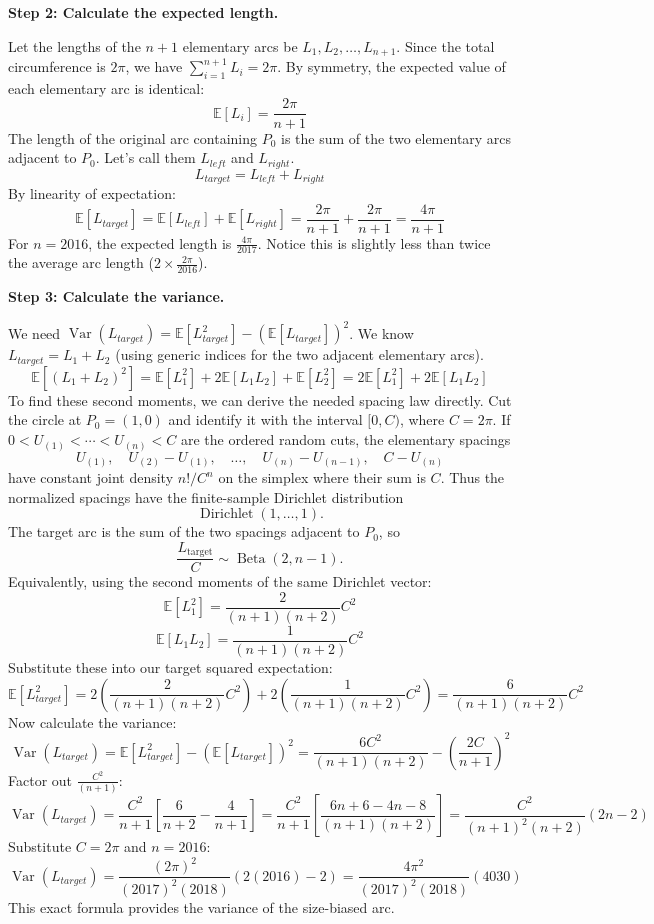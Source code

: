 \begin{solution}
\textbf{Step 2: Calculate the expected length.}

Let the lengths of the $n+1$ elementary arcs be $L_1, L_2, \dots, L_{n+1}$.
Since the total circumference is $2\pi$, we have $\sum_{i=1}^{n+1} L_i = 2\pi$.
By symmetry, the expected value of each elementary arc is identical:
\[ \mathbb{E}[L_i] = \frac{2\pi}{n+1} \]
The length of the original arc containing $P_0$ is the sum of the two elementary arcs adjacent to $P_0$. Let's call them $L_{left}$ and $L_{right}$.
\[ L_{target} = L_{left} + L_{right} \]
By linearity of expectation:
\[ \mathbb{E}[L_{target}] = \mathbb{E}[L_{left}] + \mathbb{E}[L_{right}] = \frac{2\pi}{n+1} + \frac{2\pi}{n+1} = \frac{4\pi}{n+1} \]
For $n = 2016$, the expected length is $\frac{4\pi}{2017}$.
Notice this is slightly less than twice the average arc length ($2 \times \frac{2\pi}{2016}$).

\textbf{Step 3: Calculate the variance.}

We need $\operatorname{Var}(L_{target}) = \mathbb{E}[L_{target}^2] - (\mathbb{E}[L_{target}])^2$.
We know $L_{target} = L_1 + L_2$ (using generic indices for the two adjacent elementary arcs).
\[ \mathbb{E}[(L_1 + L_2)^2] = \mathbb{E}[L_1^2] + 2\mathbb{E}[L_1 L_2] + \mathbb{E}[L_2^2] = 2\mathbb{E}[L_1^2] + 2\mathbb{E}[L_1 L_2] \]
To find these second moments, we can derive the needed spacing law directly. Cut the circle at $P_0=(1,0)$ and identify it with the interval $[0,C)$, where $C=2\pi$. If $0<U_{(1)}<\cdots<U_{(n)}<C$ are the ordered random cuts, the elementary spacings
\[
U_{(1)},\quad U_{(2)}-U_{(1)},\quad \ldots,\quad U_{(n)}-U_{(n-1)},\quad C-U_{(n)}
\]
have constant joint density $n!/C^n$ on the simplex where their sum is $C$. Thus the normalized spacings have the finite-sample Dirichlet distribution
\[
\operatorname{Dirichlet}(1,\ldots,1).
\]
The target arc is the sum of the two spacings adjacent to $P_0$, so
\[
\frac{L_{\mathrm{target}}}{C}\sim \operatorname{Beta}(2,n-1).
\]
Equivalently, using the second moments of the same Dirichlet vector:
\[ \mathbb{E}[L_1^2] = \frac{2}{(n+1)(n+2)} C^2 \]
\[ \mathbb{E}[L_1 L_2] = \frac{1}{(n+1)(n+2)} C^2 \]
Substitute these into our target squared expectation:
\[ \mathbb{E}[L_{target}^2] = 2 \left( \frac{2}{(n+1)(n+2)} C^2 \right) + 2 \left( \frac{1}{(n+1)(n+2)} C^2 \right) = \frac{6}{(n+1)(n+2)} C^2 \]
Now calculate the variance:
\[ \operatorname{Var}(L_{target}) = \mathbb{E}[L_{target}^2] - (\mathbb{E}[L_{target}])^2 = \frac{6C^2}{(n+1)(n+2)} - \left( \frac{2C}{n+1} \right)^2 \]
Factor out $\frac{C^2}{(n+1)}$:
\[ \operatorname{Var}(L_{target}) = \frac{C^2}{n+1} \left[ \frac{6}{n+2} - \frac{4}{n+1} \right] = \frac{C^2}{n+1} \left[ \frac{6n + 6 - 4n - 8}{(n+1)(n+2)} \right] = \frac{C^2}{(n+1)^2(n+2)} (2n - 2) \]
Substitute $C = 2\pi$ and $n = 2016$:
\[ \operatorname{Var}(L_{target}) = \frac{(2\pi)^2}{(2017)^2(2018)} (2(2016) - 2) = \frac{4\pi^2}{(2017)^2(2018)} (4030) \]
This exact formula provides the variance of the size-biased arc.
\end{solution}
